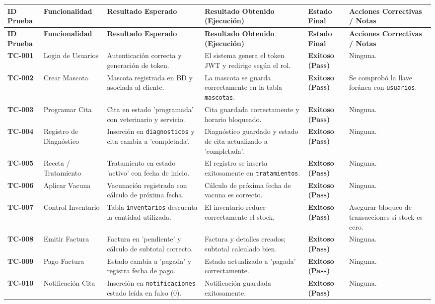 \documentclass[11pt,a4paper]{article}
\begin{document}
\begin{longtable}{|p{1.5cm}|p{2.5cm}|p{3.5cm}|p{3.5cm}|p{2cm}|p{2.5cm}|}
\hline
\rowcolor{sena-green!20}
\textbf{ID Prueba} & \textbf{Funcionalidad} & \textbf{Resultado Esperado} & \textbf{Resultado Obtenido (Ejecución)} & \textbf{Estado Final} & \textbf{Acciones Correctivas / Notas} \\
\hline
\endfirsthead
\hline
\rowcolor{sena-green!20}
\textbf{ID Prueba} & \textbf{Funcionalidad} & \textbf{Resultado Esperado} & \textbf{Resultado Obtenido (Ejecución)} & \textbf{Estado Final} & \textbf{Acciones Correctivas / Notas} \\
\hline
\endhead
\textbf{TC-001} & Login de Usuarios & Autenticación correcta y generación de token. & El sistema genera el token JWT y redirige según el rol. & \textbf{Exitoso (Pass)} & Ninguna. \\ \hline
\textbf{TC-002} & Crear Mascota & Mascota registrada en BD y asociada al cliente. & La mascota se guarda correctamente en la tabla \texttt{mascotas}. & \textbf{Exitoso (Pass)} & Se comprobó la llave foránea con \texttt{usuarios}. \\ \hline
\textbf{TC-003} & Programar Cita & Cita en estado 'programada' con veterinario y servicio. & Cita guardada correctamente y horario bloqueado. & \textbf{Exitoso (Pass)} & Ninguna. \\ \hline
\textbf{TC-004} & Registro de Diagnóstico & Inserción en \texttt{diagnosticos} y cita cambia a 'completada'. & Diagnóstico guardado y estado de cita actualizado a 'completada'. & \textbf{Exitoso (Pass)} & Ninguna. \\ \hline
\textbf{TC-005} & Receta / Tratamiento & Tratamiento en estado 'activo' con fecha de inicio. & El registro se inserta exitosamente en \texttt{tratamientos}. & \textbf{Exitoso (Pass)} & Ninguna. \\ \hline
\textbf{TC-006} & Aplicar Vacuna & Vacunación registrada con cálculo de próxima fecha. & Cálculo de próxima fecha de vacuna es correcto. & \textbf{Exitoso (Pass)} & Ninguna. \\ \hline
\textbf{TC-007} & Control Inventario & Tabla \texttt{inventarios} descuenta la cantidad utilizada. & El inventario reduce correctamente el stock. & \textbf{Exitoso (Pass)} & Asegurar bloqueo de transacciones si stock es cero. \\ \hline
\textbf{TC-008} & Emitir Factura & Factura en 'pendiente' y cálculo de subtotal correcto. & Factura y detalles creados; subtotal calculado bien. & \textbf{Exitoso (Pass)} & Ninguna. \\ \hline
\textbf{TC-009} & Pago Factura & Estado cambia a 'pagada' y registra fecha de pago. & Estado actualizado a 'pagada' correctamente. & \textbf{Exitoso (Pass)} & Ninguna. \\ \hline
\textbf{TC-010} & Notificación Cita & Inserción en \texttt{notificaciones} estado leída en falso (0). & Notificación guardada exitosamente. & \textbf{Exitoso (Pass)} & Ninguna. \\ \hline
\end{longtable}
\end{document}
